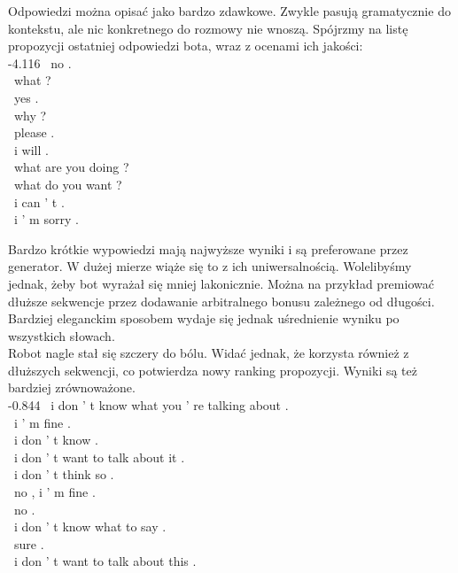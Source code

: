 

Odpowiedzi można opisać jako bardzo zdawkowe. Zwykle pasują gramatycznie do kontekstu, ale nic konkretnego do rozmowy nie wnoszą. Spójrzmy na listę propozycji ostatniej odpowiedzi bota, wraz z ocenami ich jakości:\\

\small
-4.116 \ no .\\ \ what ?\\ \ yes .\\ \ why ?\\ \ please .\\ \ i will .\\ \ what are you doing ?\\ \ what do you want ?\\ \ i can ' t .\\ \ i ' m sorry .\\
\normalsize

Bardzo krótkie wypowiedzi mają najwyższe wyniki i są preferowane przez generator. W dużej mierze wiąże się to z ich uniwersalnością. Wolelibyśmy jednak, żeby bot wyrażał się mniej lakonicznie. Można na przykład premiować dłuższe sekwencje przez dodawanie arbitralnego bonusu zależnego od długości. Bardziej eleganckim sposobem wydaje się jednak uśrednienie wyniku po wszystkich słowach.\\



Robot nagle stał się szczery do bólu. Widać jednak, że korzysta również z dłuższych sekwencji, co potwierdza nowy ranking propozycji. Wyniki są też bardziej zrównoważone.\\

\small
-0.844 \ i don ' t know what you ' re talking about .\\ \ i ' m fine .\\ \ i don ' t know .\\ \ i don ' t want to talk about it .\\ \ i don ' t think so .\\ \ no , i ' m fine .\\ \ no .\\ \ i don ' t know what to say .\\ \ sure .\\ \ i don ' t want to talk about this .\\
\normalsize

